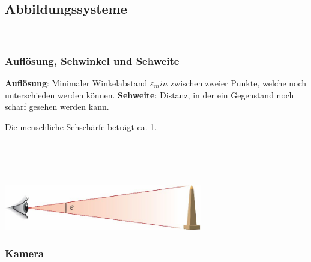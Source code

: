 \subsection{Abbildungssysteme}

 \\



\subsubsection{Auflösung, Sehwinkel und Sehweite}

\textbf{Auflösung}: Minimaler Winkelabstand $\varepsilon_min$ zwischen zweier Punkte, welche noch
unterschieden werden können.
\textbf{Sehweite}: Distanz, in der ein Gegenstand noch scharf gesehen werden kann.

Die menschliche Sehschärfe beträgt ca. 1\SIUnitSymbolArcminute.

\begin{center}
	\begin{minipage}{0.2\textwidth}
		 \\
		 \\
		 \\
	\end{minipage}%
	\begin{minipage}{0.3\textwidth}
		\includegraphics[height=2cm,keepaspectratio=true]{Images/sehwinkel.png}
	\end{minipage}
\end{center}




\subsubsection{Kamera}

